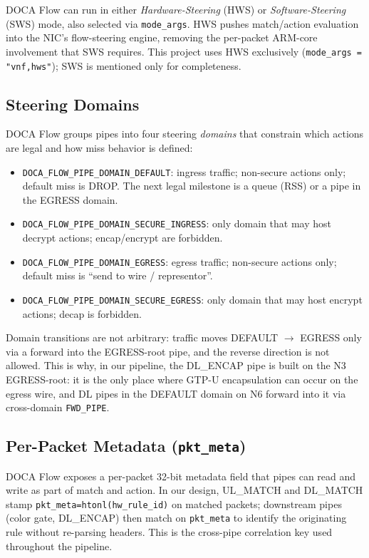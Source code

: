 \documentclass[conference]{IEEEtran}
\newcommand{\code}[1]{\nolinkurl{#1}}
\begin{document}
DOCA Flow can run in either \emph{Hardware-Steering} (HWS) or
\emph{Software-Steering} (SWS) mode, also selected via
\code{mode_args}.  HWS pushes match/action evaluation into the NIC's
flow-steering engine, removing the per-packet ARM-core involvement
that SWS requires.  This project uses HWS exclusively
(\code{mode_args = "vnf,hws"}); SWS is mentioned only for completeness.

\subsection{Steering Domains}

DOCA Flow groups pipes into four steering \emph{domains} that
constrain which actions are legal and how miss behavior is defined:

\begin{itemize}
  \item \texttt{DOCA\_FLOW\_PIPE\_DOMAIN\_DEFAULT}: ingress traffic;
        non-secure actions only; default miss is DROP.  The next
        legal milestone is a queue (RSS) or a pipe in the EGRESS
        domain.
  \item \texttt{DOCA\_FLOW\_PIPE\_DOMAIN\_SECURE\_INGRESS}: only
        domain that may host decrypt actions; encap/encrypt are
        forbidden.
  \item \texttt{DOCA\_FLOW\_PIPE\_DOMAIN\_EGRESS}: egress traffic;
        non-secure actions only; default miss is ``send to wire /
        representor''.
  \item \texttt{DOCA\_FLOW\_PIPE\_DOMAIN\_SECURE\_EGRESS}: only
        domain that may host encrypt actions; decap is forbidden.
\end{itemize}

Domain transitions are not arbitrary: traffic moves DEFAULT $\to$
EGRESS only via a forward into the EGRESS-root pipe, and the reverse
direction is not allowed.  This is why, in our pipeline, the
DL\_ENCAP pipe is built on the N3 EGRESS-root: it is the only place
where GTP-U encapsulation can occur on the egress wire, and DL pipes
in the DEFAULT domain on N6 forward into it via cross-domain
\code{FWD_PIPE}.

\subsection{Per-Packet Metadata (\texttt{pkt\_meta})}

DOCA Flow exposes a per-packet 32-bit metadata field that pipes can
read and write as part of match and action.  In our design,
UL\_MATCH and DL\_MATCH stamp \code{pkt_meta=htonl(hw_rule_id)} on
matched packets; downstream pipes (color gate, DL\_ENCAP) then
match on \code{pkt_meta} to identify the originating rule without
re-parsing headers.  This is the cross-pipe correlation key used
throughout the pipeline.
\end{document}
